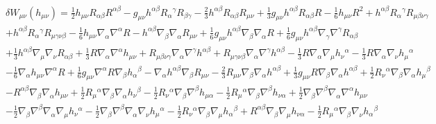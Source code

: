 \documentclass[aps]{revtex4}
\begin{document}
\begin{eqnarray}
&&\delta W_{\mu\nu}(h_{\mu\nu})=\tfrac{1}{2} h_{\mu \nu} R_{\alpha \beta} R^{\alpha \beta} -  g_{\mu \nu} h^{\alpha \beta} R_{\alpha}{}^{\gamma} R_{\beta \gamma} -  \tfrac{2}{3} h^{\alpha \beta} R_{\alpha \beta} R_{\mu \nu} + \tfrac{1}{3} g_{\mu \nu} h^{\alpha \beta} R_{\alpha \beta} R -  \tfrac{1}{6} h_{\mu \nu} R^2 
+ h^{\alpha \beta} R_{\alpha}{}^{\gamma} R_{\mu \beta \nu \gamma} 
\nonumber\\
&&+ h^{\alpha \beta} R_{\alpha}{}^{\gamma} R_{\mu \gamma \nu \beta} -  \tfrac{1}{6} h_{\mu \nu} \nabla_{\alpha}\nabla^{\alpha}R -  h^{\alpha \beta} \nabla_{\beta}\nabla_{\alpha}R_{\mu \nu} + \tfrac{1}{6} g_{\mu \nu} h^{\alpha \beta} \nabla_{\beta}\nabla_{\alpha}R + \tfrac{1}{6} g_{\mu \nu} h^{\alpha \beta} \nabla_{\gamma}\nabla^{\gamma}R_{\alpha \beta} 
\nonumber\\
&&+ \tfrac{1}{3} h^{\alpha \beta} \nabla_{\mu}\nabla_{\nu}R_{\alpha \beta}
+\tfrac{1}{3} R \nabla_{\alpha}\nabla^{\alpha}h_{\mu \nu} + R_{\mu \beta \nu \gamma} \nabla_{\alpha}\nabla^{\gamma}h^{\alpha \beta} + R_{\mu \gamma \nu \beta} \nabla_{\alpha}\nabla^{\gamma}h^{\alpha \beta} -  \tfrac{1}{3} R \nabla_{\alpha}\nabla_{\mu}h_{\nu}{}^{\alpha} -  \tfrac{1}{3} R \nabla_{\alpha}\nabla_{\nu}h_{\mu}{}^{\alpha} 
\nonumber\\
&&-  \tfrac{1}{6} \nabla_{\alpha}h_{\mu \nu} \nabla^{\alpha}R 
+ \tfrac{1}{6} g_{\mu \nu} \nabla^{\alpha}R \nabla_{\beta}h_{\alpha}{}^{\beta} -  \nabla_{\alpha}h^{\alpha \beta} \nabla_{\beta}R_{\mu \nu} -  \tfrac{2}{3} R_{\mu \nu} \nabla_{\beta}\nabla_{\alpha}h^{\alpha \beta} + \tfrac{1}{3} g_{\mu \nu} R \nabla_{\beta}\nabla_{\alpha}h^{\alpha \beta} + \tfrac{1}{2} R_{\nu}{}^{\alpha} \nabla_{\beta}\nabla_{\alpha}h_{\mu}{}^{\beta} 
\nonumber\\
&&-  R^{\alpha \beta} \nabla_{\beta}\nabla_{\alpha}h_{\mu \nu} 
+ \tfrac{1}{2} R_{\mu}{}^{\alpha} \nabla_{\beta}\nabla_{\alpha}h_{\nu}{}^{\beta} -  \tfrac{1}{2} R_{\nu}{}^{\alpha} \nabla_{\beta}\nabla^{\beta}h_{\mu \alpha} -  \tfrac{1}{2} R_{\mu}{}^{\alpha} \nabla_{\beta}\nabla^{\beta}h_{\nu \alpha} + \tfrac{1}{2} \nabla_{\beta}\nabla^{\beta}\nabla_{\alpha}\nabla^{\alpha}h_{\mu \nu} 
\nonumber\\
&&-  \tfrac{1}{2} \nabla_{\beta}\nabla^{\beta}\nabla_{\alpha}\nabla_{\mu}h_{\nu}{}^{\alpha} 
-  \tfrac{1}{2} \nabla_{\beta}\nabla^{\beta}\nabla_{\alpha}\nabla_{\nu}h_{\mu}{}^{\alpha} -  \tfrac{1}{2} R_{\nu}{}^{\alpha} \nabla_{\beta}\nabla_{\mu}h_{\alpha}{}^{\beta} + R^{\alpha \beta} \nabla_{\beta}\nabla_{\mu}h_{\nu \alpha} -  \tfrac{1}{2} R_{\mu}{}^{\alpha} \nabla_{\beta}\nabla_{\nu}h_{\alpha}{}^{\beta} 

\end{eqnarray}
\end{document}
